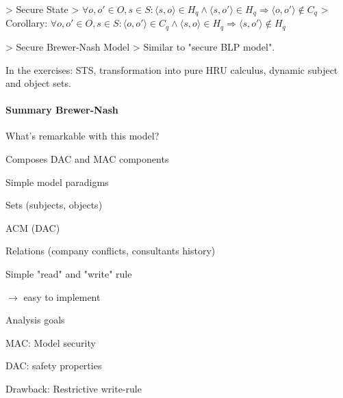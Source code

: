 \documentclass[a4paper]{article}
\begin{document}
\begin{multicols}{3}
    > Secure State
    > $\forall o,o' \in O,s\in S:⟨s,o⟩\in H_q\wedge⟨s,o'⟩\in H_q\Rightarrow⟨o,o'⟩\not\in C_q$
    > Corollary: $\forall o,o'\in O,s\in S:⟨o,o'⟩\in C_q\wedge⟨s,o⟩\in H_q\Rightarrow ⟨s,o'⟩\not\in H_q$

    > Secure Brewer-Nash Model
    > Similar to "secure BLP model".

    In the exercises: STS, transformation into pure HRU calculus, dynamic subject and object sets.

    \paragraph{Summary Brewer-Nash}
    What’s remarkable with this model?
    \begin{itemize*}
        \item Composes DAC and MAC components
        \item Simple model paradigms
              \begin{itemize*}
                  \item Sets (subjects, objects)
                  \item ACM (DAC)
                  \item Relations (company conflicts, consultants history)
                  \item Simple "read" and "write" rule
                  \item $\rightarrow$ easy to implement
              \end{itemize*}
        \item Analysis goals
              \begin{itemize*}
                  \item MAC: Model security
                  \item DAC: safety properties
              \end{itemize*}
        \item Drawback: Restrictive write-rule
    \end{itemize*}


\end{multicols}
\end{document}
